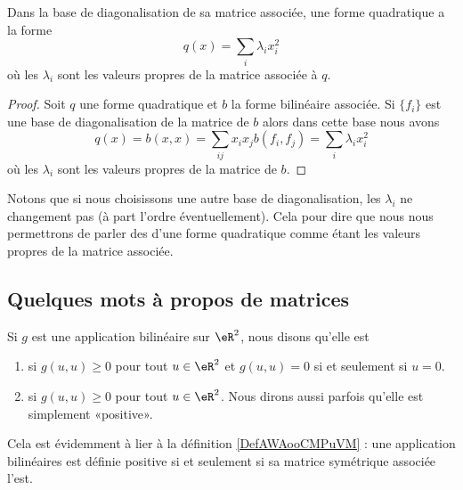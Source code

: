 \begin{proposition}\label{PropFWYooQXfcVY}
    Dans la base de diagonalisation de sa matrice associée, une forme quadratique a la forme
    \begin{equation}
        q(x)=\sum_i\lambda_ix_i^2
    \end{equation}
    où les \( \lambda_i\) sont les valeurs propres de la matrice associée à \( q\).
\end{proposition}

\begin{proof}
Soit \( q\) une forme quadratique et \( b\) la forme bilinéaire associée. Si \( \{ f_i \}\) est une base de diagonalisation de la matrice de \( b\) alors dans cette base nous avons
\begin{equation}
    q(x)=b(x,x)=\sum_{ij}x_ix_jb(f_i,f_j)=\sum_i\lambda_ix_i^2
\end{equation}
où les \( \lambda_i\) sont les valeurs propres de la matrice de \( b\).
\end{proof}
Notons que si nous choisissons une autre base de diagonalisation, les \( \lambda_i\) ne changement pas (à part l'ordre éventuellement). Cela pour dire que nous nous permettrons de parler des  d'une forme quadratique comme étant les valeurs propres de la matrice associée.

\subsection{Quelques mots à propos de matrices}

Si $g$ est une application bilinéaire sur $\eR^2$, nous disons qu'elle est
\begin{enumerate}
\item
{} si $g(u,u)\geq 0$ pour tout $u\in\eR^2$ et $g(u,u)=0$ si et seulement si $u=0$.
\item
{} si $g(u,u)\geq 0$ pour tout $u\in\eR^2$. Nous dirons aussi parfois qu'elle est simplement «positive».
\end{enumerate}
Cela est évidemment à lier à la définition \ref{DefAWAooCMPuVM} : une application bilinéaires est définie positive si et seulement si sa matrice symétrique associée l'est.

